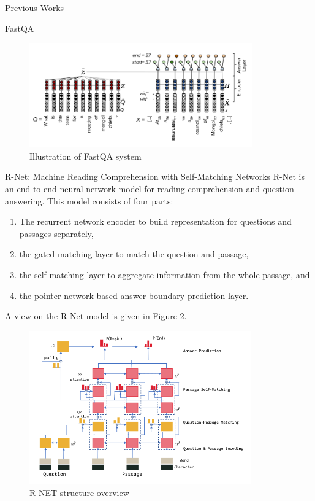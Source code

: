 \documentclass{article}
\begin{document}
\begin{psection}{Previous Works}
\begin{psubsection}{FastQA}
		\begin{figure}[ht!]
			\centering
			\includegraphics[height=170px]{includes/fast-qa.png}
			\caption{Illustration of FastQA system }
			\label{fig:fqa}
		\end{figure}

	\end{psubsection}

	\begin{psubsection}{R-Net: Machine Reading Comprehension with Self-Matching Networks}
		R-Net \citep{r-net} is an end-to-end neural network model for reading comprehension and question answering.
		This model consists of four parts:
		\begin{enumerate}
			\item The recurrent network encoder to build representation for questions and passages separately,
			\item the gated matching layer to match the question and passage,
			\item the self-matching layer to aggregate information from the whole passage, and
			\item the pointer-network based answer boundary prediction layer.
		\end{enumerate}

		A view on the R-Net model is given in Figure \ref{fig:r-net}.

		\begin{figure}[ht!]
			\centering
			\includegraphics[height=250px]{includes/r-net.png}
			\caption{R-NET structure overview }
			\label{fig:r-net}
		\end{figure}


\end{psubsection}
\end{psection}
\end{document}
